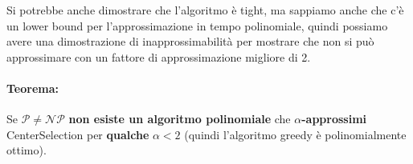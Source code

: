 Si potrebbe anche dimostrare che l'algoritmo è tight, ma sappiamo anche che c'è un lower bound per l'approssimazione in tempo polinomiale, quindi possiamo avere una dimostrazione di inapprossimabilità per mostrare che non si può approssimare con un fattore di approssimazione migliore di 2.\\

\newpage

\paragraph{Teorema:} Se $\mathcal{P} \neq \mathcal{NP}$ \textbf{non esiste un algoritmo polinomiale} che \textbf{$\alpha$-approssimi} CenterSelection per \textbf{qualche} $\alpha < 2$ (quindi l'algoritmo greedy è polinomialmente ottimo).\\

